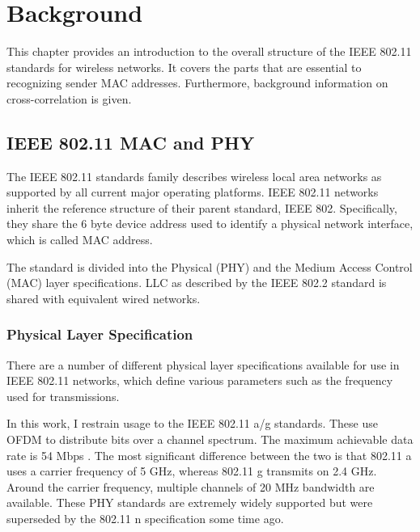
\chapter{Background}\label{ch:relatedwork}
\glsresetall %

This chapter provides an introduction to the overall structure of the \gls{IEEE} 802.11 standards for wireless networks. It covers the parts that are essential to recognizing sender \gls{MAC} addresses. Furthermore, background information on cross-correlation is given.



\section{IEEE 802.11 MAC and PHY} \label{sec:mac-and-phy}

The \gls{IEEE} 802.11 standards family describes wireless local area networks as supported by all current major operating platforms. \gls{IEEE} 802.11 networks inherit the reference structure of their parent standard, \gls{IEEE} 802. Specifically, they share the 6 byte device address used to identify a physical network interface, which is called \gls{MAC} address.

The standard is divided into the Physical (PHY) and the Medium Access Control (MAC) layer specifications. \gls{LLC} as described by the \gls{IEEE} 802.2 standard is shared with equivalent wired networks.


\subsection{Physical Layer Specification}

There are a number of different physical layer specifications available for use in \gls{IEEE} 802.11 networks, which define various parameters such as the frequency used for transmissions.

In this work, I restrain usage to the \gls{IEEE} 802.11 a/g standards. These use \gls{OFDM} to distribute bits over a channel spectrum. The maximum achievable data rate is 54 \gls{Mbps} \cite{ieee2012}. The most significant difference between the two is that 802.11 a uses a carrier frequency of 5 GHz, whereas 802.11 g transmits on 2.4 GHz. Around the carrier frequency, multiple channels of 20 MHz bandwidth are available. These \gls{PHY} standards are extremely widely supported but were superseded by the 802.11 n specification some time ago.

